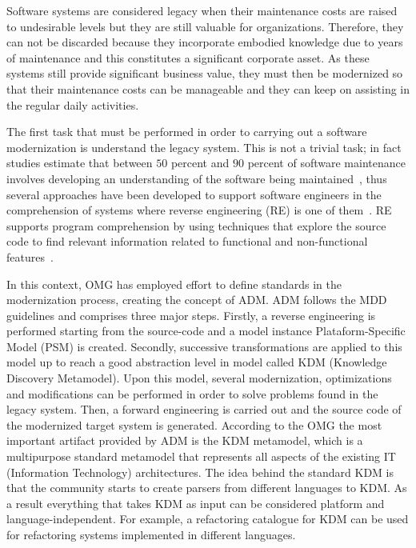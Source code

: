 Software systems are considered legacy when their maintenance costs are raised to undesirable levels but they are still valuable for organizations. Therefore, they can not be discarded because they incorporate embodied knowledge due to years of maintenance and this constitutes a significant corporate asset. As these systems still provide significant business value, they must then be modernized so that their maintenance costs can be manageable and they can keep on assisting in the regular daily activities. 

The first task that must be performed in order to carrying out a software modernization is understand the legacy system. This is not a trivial task; in fact studies estimate that between $50$ percent and $90$ percent of software maintenance involves developing an understanding of the software being maintained~\cite{Tilley95perspectiveson}, thus several approaches have been developed to support software engineers in the comprehension of systems where reverse engineering (RE) is one of them~\cite{Canfora2011}. RE supports program comprehension by using techniques that explore the source code to find relevant information related to functional and non-functional features~\cite{chikofskyTax}.

In this context, OMG has employed effort to define standards in the modernization process, creating the concept of ADM. ADM follows the MDD~\cite{5440163} guidelines and comprises three major steps. Firstly, a reverse engineering is performed starting from the source-code and a model instance Plataform-Specific Model (PSM) is created. Secondly, successive transformations are applied to this model up to reach a good abstraction level in model called KDM (Knowledge Discovery Metamodel). Upon this model, several modernization, optimizations and modifications can be performed in order to solve problems found in the legacy system. Then, a forward engineering is carried out and the source code of the modernized target system is generated. According to the OMG the most important artifact provided by ADM is the KDM metamodel, which is a multipurpose standard metamodel that represents all aspects of the existing IT (Information  Technology) architectures. The idea behind the standard KDM is that the community starts to create parsers from different languages to KDM. As a result everything that takes KDM as input can be considered platform and language-independent. For example, a refactoring catalogue for KDM can be used for refactoring systems implemented in different languages. 

